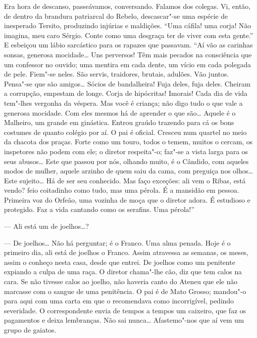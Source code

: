 Era hora de descanso, passeávamos, conversando. Falamos dos
colegas. Vi, então, de dentro da brandura patriarcal do Rebelo,
descascar"-se uma espécie de inesperado Tersito, produzindo injúrias e
maldições. ``Uma cáfila! uma corja! Não imagina, meu caro Sérgio. Conte
como uma desgraça ter de viver com esta gente.'' E esbeiçou um lábio
sarcástico para os rapazes que passavam. ``Aí vão as carinhas sonsas,
generosa mocidade\ldots{} Uns perversos! Têm mais pecados na consciência que
um confessor no ouvido; uma mentira em cada dente, um vício em cada
polegada de pele. Fiem"-se neles. São servis, traidores, brutais,
adulões. Vão juntos. Pensa"-se que são amigos\ldots{} Sócios de
bandalheira! Fuja deles, fuja deles. Cheiram a corrupção, empestam de longe. 
Corja de hipócritas! Imorais! Cada dia de vida tem"-lhes vergonha da véspera.
Mas você é criança; não digo tudo o que vale a generosa mocidade. Com
eles mesmos há de aprender o que são\ldots{} Aquele é o Malheiro, um grande
em ginástica. Entrou graúdo trazendo para cá os bons costumes de quanto
colégio por aí. O pai é oficial. Cresceu num quartel no meio da chacota
dos praças. Forte como um touro, todos o temem, muitos o cercam, os
inspetores não podem com ele; o diretor respeita"-o; faz"-se a vista
larga para os seus abusos\ldots{} Este que passou por nós, olhando muito, é
o Cândido, com aqueles modos de mulher, aquele arzinho de quem saiu da
cama, com preguiça nos olhos\ldots{} Este sujeito\ldots{} Há de ser seu
conhecido. Mas faço exceções: ali vem o Ribas, está vendo? feio
coitadinho como tudo, mas uma pérola. É a mansidão em pessoa. Primeira
voz do Orfeão, uma vozinha de moça que o diretor adora. É estudioso e
protegido. Faz a vida cantando como os serafins. Uma pérola!'' 

--- Ali está um de joelhos\ldots{}? 

--- De joelhos\ldots{} Não há perguntar; é o Franco.
Uma alma penada. Hoje é o primeiro dia, ali está de joelhos o Franco.
Assim atravessa as semanas, os meses, assim o conheço nesta casa, desde
que entrei. De joelhos como um penitente expiando a culpa de uma raça.
O diretor chama"-lhe cão, diz que tem calos na cara. Se não tivesse
calos ao joelho, não haveria canto do Ateneu que ele não marcasse com o
sangue de uma penitência. O pai é de Mato Grosso; mandou"-o para aqui
com uma carta em que o recomendava como incorrigível, pedindo
severidade. O correspondente envia de tempos a tempos um caixeiro, que
faz os pagamentos e deixa lembranças. Não sai nunca\ldots{} Afastemo"-nos
que aí vem um grupo de gaiatos. 

